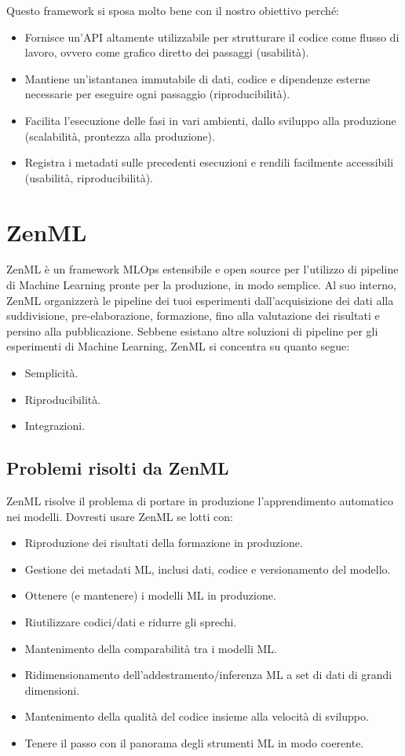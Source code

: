 \documentclass[12pt,a4paper]{report}
\begin{document}
Questo framework si sposa molto bene con il nostro obiettivo perché:
\begin{itemize}
    \item Fornisce un'API altamente utilizzabile per strutturare il codice come flusso di lavoro, ovvero come grafico diretto dei passaggi (usabilità).
    \item Mantiene un'istantanea immutabile di dati, codice e dipendenze esterne necessarie per eseguire ogni passaggio (riproducibilità).
    \item Facilita l'esecuzione delle fasi in vari ambienti, dallo sviluppo alla produzione (scalabilità, prontezza alla produzione).
    \item Registra i metadati sulle precedenti esecuzioni e rendili facilmente accessibili (usabilità, riproducibilità).
\end{itemize}

\section{ZenML}
ZenML è un framework MLOps estensibile e open source per l'utilizzo di pipeline di Machine Learning pronte per la produzione, in modo semplice. Al suo interno, ZenML organizzerà le pipeline dei tuoi esperimenti dall'acquisizione dei dati alla suddivisione, pre-elaborazione, formazione, fino alla valutazione dei risultati e persino alla pubblicazione.
Sebbene esistano altre soluzioni di pipeline per gli esperimenti di Machine Learning, ZenML si concentra su quanto segue:
\begin{itemize}
    \item Semplicità.
    \item Riproducibilità.
    \item Integrazioni.
\end{itemize}

\subsection{Problemi risolti da ZenML}
ZenML risolve il problema di portare in produzione l'apprendimento automatico nei modelli. Dovresti usare ZenML se lotti con:
\begin{itemize}
    \item Riproduzione dei risultati della formazione in produzione.
    \item Gestione dei metadati ML, inclusi dati, codice e versionamento del modello.
    \item Ottenere (e mantenere) i modelli ML in produzione.
    \item Riutilizzare codici/dati e ridurre gli sprechi.
    \item Mantenimento della comparabilità tra i modelli ML.
    \item Ridimensionamento dell'addestramento/inferenza ML a set di dati di grandi dimensioni.
    \item Mantenimento della qualità del codice insieme alla velocità di sviluppo.
    \item Tenere il passo con il panorama degli strumenti ML in modo coerente.
\end{itemize}
\end{document}
